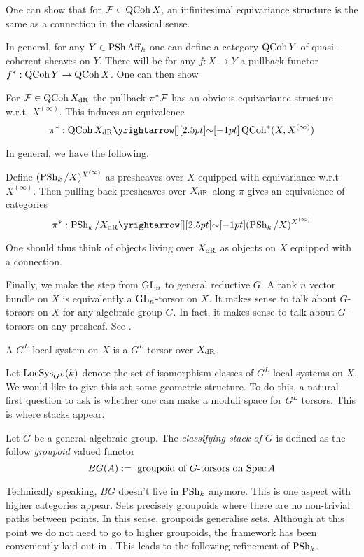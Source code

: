 \documentclass[./main.tex]{subfiles}
\begin{document}
One can show that for $\mathcal{F} \in \operatorname{QCoh} X$,
an infinitesimal equivariance structure is the same as
a connection in the classical sense.

In general, for any $Y \in \operatorname{PSh} \mathrm{Aff}_k$ one can define a category 
$\operatorname{QCoh} Y$ of quasi-coherent sheaves on $Y$.
There will be for any $f : X \to Y$ a pullback functor
$f^* : \operatorname{QCoh} Y \to \operatorname{QCoh} X$.
One can then show
\begin{prop}
  
  For $\mathcal{F} \in \operatorname{QCoh} X_{\mathrm{dR}}$ the pullback $\pi^* \mathcal{F}$ has
  an obvious equivariance structure w.r.t. $X^{(\infty)}$.
  This induces an equivalence \[
    \pi^* : \QCOH X_\DR \map{\sim}{} \QCOH^*(X , X^{(\infty)})
  \]
\end{prop}

In general, we have the following.

\begin{prop}

  Define $(\operatorname{PSh}_k / X)^{X^{(\infty)}}$ as
  presheaves over $X$ equipped with equivariance w.r.t $X^{(\infty)}$.
  Then pulling back presheaves over $X_{\mathrm{dR}}$ along $\pi$
  gives an equivalence of categories \[
    \pi^* : \PSH_k / X_\DR \map{\sim}{} (\PSH_k / X)^{X^{(\infty)}}
  \]
\end{prop}
One should thus think of objects living over $X_{\mathrm{dR}}$ as
objects on $X$ equipped with a connection.

Finally, we make the step from $\operatorname{GL}_n$ to general reductive $G$.
A rank $n$ vector bundle on $X$ is equivalently a $\operatorname{GL}_n$-torsor on $X$.
It makes sense to talk about $G$-torsors on $X$ for any algebraic group $G$.
In fact, it makes sense to talk about $G$-torsors on any presheaf.
See \cite[Section 0.3.3]{Zhu-16}.

\begin{dfn}
  
  A $G^L$-local system on $X$ is a $G^L$-torsor over $X_{\mathrm{dR}}$.
\end{dfn}

Let $\operatorname{LocSys}_{G^L}(k)$ denote the set of isomorphism classes of 
$G^L$ local systems on $X$.
We would like to give this set some geometric structure.
To do this, a natural first question to ask is
whether one can make a moduli space for $G^L$ torsors.
This is where stacks appear.

\begin{dfn}
  
  Let $G$ be a general algebraic group.
  The \emph{classifying stack of $G$} is defined as the
  follow \emph{groupoid} valued functor \[
    BG(A) := \text{ groupoid of $G$-torsors on $\operatorname{Spec} A$}
  \] 
\end{dfn}
Technically speaking, $BG$ doesn't live in $\operatorname{PSh}_k$ anymore.
This is one aspect with higher categories appear.
Sets precisely groupoids where there are no non-trivial paths between points.
In this sense, groupoids generalise sets.
Although at this point we do not need to go to higher groupoids,
the framework has been conveniently laid out in \cite{lurie-htt}.
This leads to the following refinement of $\operatorname{PSh}_k$.
\end{document}
